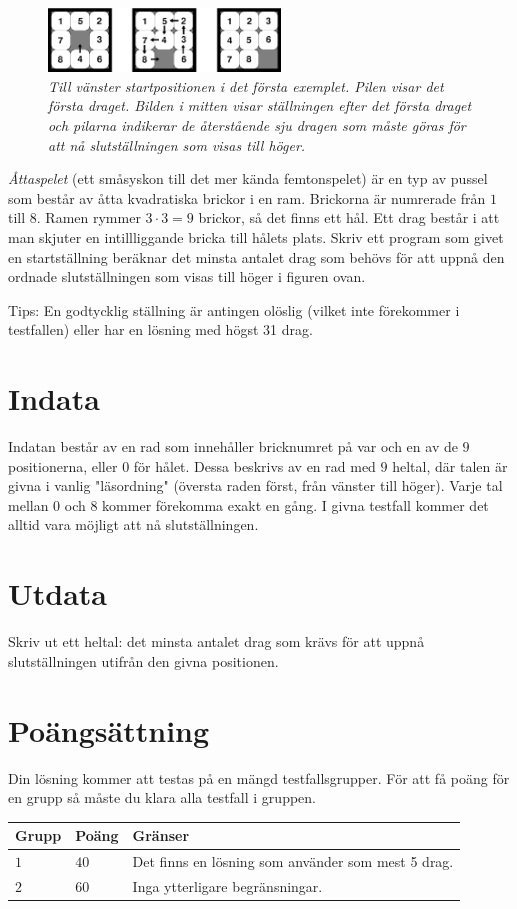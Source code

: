 
\begin{figure}[!h]
	\centering
	\includegraphics[width=0.55\textwidth]{figur}
	\caption{\emph{Till vänster startpositionen i det första exemplet. Pilen visar det första draget. Bilden i mitten visar ställningen efter det första draget och pilarna indikerar de återstående sju dragen som måste göras för att nå slutställningen som visas till höger.}}
\end{figure}


\emph{Åttaspelet} (ett småsyskon till det mer kända femtonspelet) är en typ av pussel som består av åtta kvadratiska brickor i en ram. Brickorna är numrerade från $1$ till $8$. Ramen rymmer $3\cdot3=9$ brickor, så det finns ett hål. Ett drag består i att man skjuter en intillliggande bricka till hålets plats. Skriv ett program som givet en startställning beräknar det minsta antalet drag som behövs för att uppnå den ordnade slutställningen som visas till höger i figuren ovan.

Tips: En godtycklig ställning är antingen olöslig (vilket inte förekommer i testfallen) eller har en lösning med högst 31 drag.

\section*{Indata}
Indatan består av en rad som innehåller bricknumret på var och en av de $9$ positionerna, eller $0$ för hålet.
Dessa beskrivs av en rad med $9$ heltal, där talen är givna i vanlig "läsordning" (översta raden först, från vänster till höger).
Varje tal mellan $0$ och $8$ kommer förekomma exakt en gång. I givna testfall kommer det alltid vara möjligt att nå slutställningen.

\section*{Utdata}
Skriv ut ett heltal: det minsta antalet drag som krävs för att uppnå slutställningen utifrån den givna positionen.

\section*{Poängsättning}
Din lösning kommer att testas på en mängd testfallsgrupper.
För att få poäng för en grupp så måste du klara alla testfall i gruppen.

\noindent
\begin{tabular}{| l | l | p{12cm} |}
  \hline
  \textbf{Grupp} & \textbf{Poäng} & \textbf{Gränser} \\ \hline
  $1$    & $40$          & Det finns en lösning som använder som mest 5 drag.  \\ \hline
  $2$    & $60$          & Inga ytterligare begränsningar.  \\ \hline
\end{tabular}
